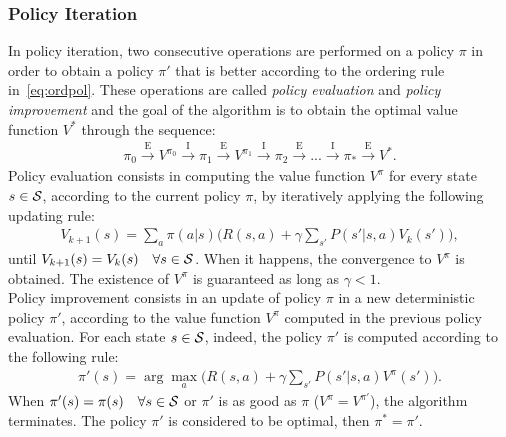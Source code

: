 \subsubsection{Policy Iteration}
In policy iteration, two consecutive operations are performed on a policy $\pi$ in order to obtain a policy $\pi'$ that is better according to the ordering rule in~\eqref{eq:ordpol}. These operations are called \emph{policy evaluation} and \emph{policy improvement} and the goal of the algorithm is to obtain the optimal value function $V^{*}$ through the sequence:
\begin{align}
\pi_{0} \xrightarrow{\text{E}} V^{\pi_{0}} \xrightarrow{\text{I}} \pi_{1} \xrightarrow{\text{E}} V^{\pi_{1}} \xrightarrow{\text{I}} \pi_{2} \xrightarrow{\text{E}} ... \xrightarrow{\text{I}} \pi_{*} \xrightarrow{\text{E}} V^{*}.
\end{align}
Policy evaluation consists in computing the value function $V^{\pi}$ for every state $s \in \mathcal{S}$, according to the current policy $\pi$, by iteratively applying the following updating rule:
\begin{align} V_{k+1}(s) = \sum_{a}\pi(a|s) \Big( R(s,a) + \gamma \sum_{s'}P(s'|s,a) V_{k}(s') \Big), \label{eq:updrule} \end{align}
until $V_{k+1}(s) = V_{k}(s) \quad \forall s \in \mathcal{S}$. When it happens, the convergence to $V^{\pi}$ is obtained. The existence of $V^{\pi}$ is guaranteed as long as $\gamma < 1$.  \\
\newline
Policy improvement consists in an update of policy $\pi$ in a new deterministic policy $\pi'$, according to the value function $V^{\pi}$ computed in the previous policy evaluation. For each state $s \in \mathcal{S}$, indeed, the policy $\pi'$ is computed according to the following rule:
\begin{align} 
\pi'(s) = \arg \max_{a} \Big( R(s,a) + \gamma \sum_{s'} P(s'|s,a)  V^{\pi}(s') \Big). \label{eq:polimp}
\end{align}
When $\pi'(s) = \pi(s) \quad \forall s \in \mathcal{S}$ or $\pi'$ is as good as $\pi$ (\ie $V^{\pi} = V^{\pi'}$), the algorithm terminates. The policy $\pi'$ is considered to be optimal, then $\pi^{*} = \pi'$.
